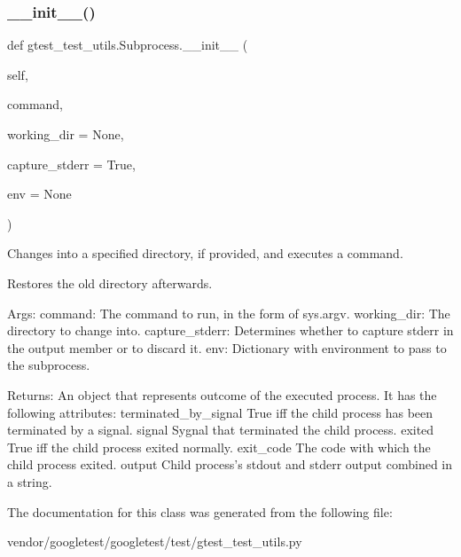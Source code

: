 \subsubsection{\texorpdfstring{\+\_\+\+\_\+init\+\_\+\+\_\+()}{\_\_init\_\_()}}
{\footnotesize\ttfamily def gtest\+\_\+test\+\_\+utils.\+Subprocess.\+\_\+\+\_\+init\+\_\+\+\_\+ (\begin{DoxyParamCaption}\item[{}]{self,  }\item[{}]{command,  }\item[{}]{working\+\_\+dir = {\ttfamily None},  }\item[{}]{capture\+\_\+stderr = {\ttfamily True},  }\item[{}]{env = {\ttfamily None} }\end{DoxyParamCaption})}

\begin{DoxyVerb}Changes into a specified directory, if provided, and executes a command.

Restores the old directory afterwards.

Args:
  command:        The command to run, in the form of sys.argv.
  working_dir:    The directory to change into.
  capture_stderr: Determines whether to capture stderr in the output member
              or to discard it.
  env:            Dictionary with environment to pass to the subprocess.

Returns:
  An object that represents outcome of the executed process. It has the
  following attributes:
terminated_by_signal   True iff the child process has been terminated
                       by a signal.
signal                 Sygnal that terminated the child process.
exited                 True iff the child process exited normally.
exit_code              The code with which the child process exited.
output                 Child process's stdout and stderr output
                       combined in a string.
\end{DoxyVerb}
 

The documentation for this class was generated from the following file\+:\begin{DoxyCompactItemize}
\item 
vendor/googletest/googletest/test/gtest\+\_\+test\+\_\+utils.\+py\end{DoxyCompactItemize}

